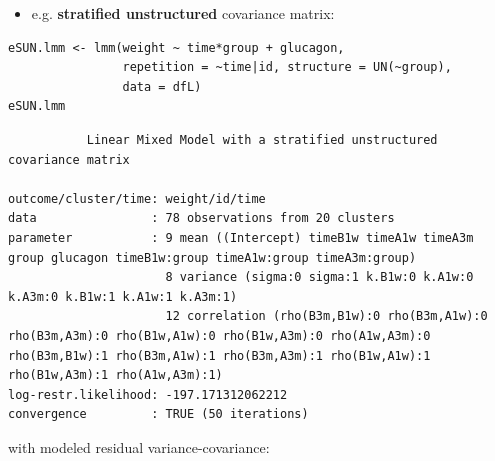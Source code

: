 \documentclass[12pt]{article}
\begin{document}
\clearpage

\begin{itemize}
\item e.g. \textbf{stratified unstructured} covariance matrix:
\end{itemize}
\lstset{language=r,label= ,caption= ,captionpos=b,numbers=none}
\begin{lstlisting}
eSUN.lmm <- lmm(weight ~ time*group + glucagon,
                repetition = ~time|id, structure = UN(~group),
                data = dfL)
eSUN.lmm
\end{lstlisting}
\begin{verbatim}
	       Linear Mixed Model with a stratified unstructured covariance matrix 

outcome/cluster/time: weight/id/time 
data                : 78 observations from 20 clusters 
parameter           : 9 mean ((Intercept) timeB1w timeA1w timeA3m group glucagon timeB1w:group timeA1w:group timeA3m:group) 
                      8 variance (sigma:0 sigma:1 k.B1w:0 k.A1w:0 k.A3m:0 k.B1w:1 k.A1w:1 k.A3m:1) 
                      12 correlation (rho(B3m,B1w):0 rho(B3m,A1w):0 rho(B3m,A3m):0 rho(B1w,A1w):0 rho(B1w,A3m):0 rho(A1w,A3m):0 rho(B3m,B1w):1 rho(B3m,A1w):1 rho(B3m,A3m):1 rho(B1w,A1w):1 rho(B1w,A3m):1 rho(A1w,A3m):1) 
log-restr.likelihood: -197.171312062212 
convergence         : TRUE (50 iterations)
\end{verbatim}



with modeled residual variance-covariance:

\bigskip
\end{document}
